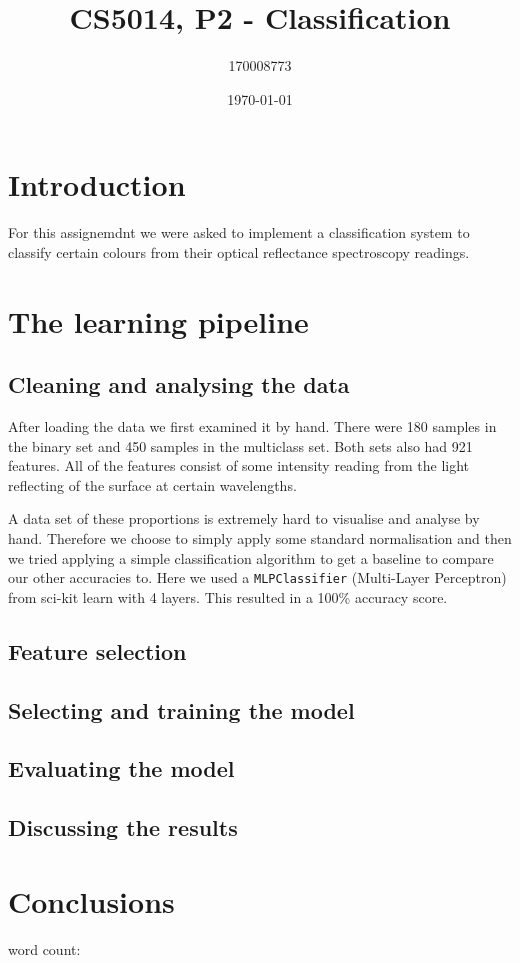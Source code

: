 \documentclass[british]{article}
\title{CS5014, P2 - Classification}
\author{170008773}
\date{\today}
\newcommand{\code}[1]{\texttt{#1}}
\begin{document}
\maketitle

\section{Introduction}
\label{intro}
For this assignemdnt we were asked to implement a classification system to classify certain colours from their optical reflectance spectroscopy readings. 
\section{The learning pipeline}
\label{content}

\subsection{Cleaning and analysing the data}
\label{cleaning}
After loading the data we first examined it by hand. There were 180 samples in the binary set and 450 samples in the multiclass set. Both sets also had 921 features. All of the features consist of some intensity reading from the light reflecting of the surface at certain wavelengths. 

A data set of these proportions is extremely hard to visualise and analyse by hand. Therefore we choose to simply apply some standard normalisation and then we tried applying a simple classification algorithm to get a baseline to compare our other accuracies to. Here we used a \code{MLPClassifier} (Multi-Layer Perceptron) from sci-kit learn with 4 layers. This resulted in a 100\% accuracy score. 




\subsection{Feature selection}


\subsection{Selecting and training the model}


\subsection{Evaluating the model}
\label{evaluation}


\subsection{Discussing the results}
\label{discussion}


\section{Conclusions}
 
 
word count: 
\printbibliography
\end{document}

